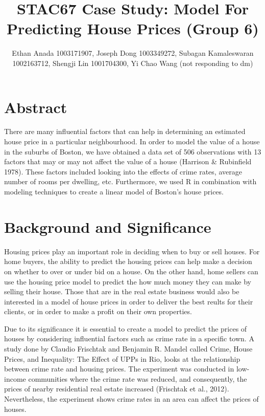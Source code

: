 \documentclass[]{article}
\title{STAC67 Case Study: Model For Predicting House Prices (Group 6)}
\author{Ethan Anada 1003171907, Joseph Dong 1003349272, Subagan Kamaleswaran
1002163712, Shengji Lin 1001704300, Yi Chao Wang (not responding to dm)}
\date{}
\begin{document}
\maketitle

\section{Abstract}\label{abstract}

There are many influential factors that can help in determining an
estimated house price in a particular neighbourhood. In order to model
the value of a house in the suburbs of Boston, we have obtained a data
set of 506 observations with 13 factors that may or may not affect the
value of a house (Harrison \& Rubinfield 1978). These factors included
looking into the effects of crime rates, average number of rooms per
dwelling, etc. Furthermore, we used R in combination with modeling
techniques to create a linear model of Boston's house prices.

\pagebreak

\section{Background and Significance}\label{background-and-significance}

Housing prices play an important role in deciding when to buy or sell
houses. For home buyers, the ability to predict the housing prices can
help make a decision on whether to over or under bid on a house. On the
other hand, home sellers can use the housing price model to predict the
how much money they can make by selling their house. Those that are in
the real estate business would also be interested in a model of house
prices in order to deliver the best reults for their clients, or in
order to make a profit on their own properties.

Due to its significance it is essential to create a model to predict the
prices of houses by considering influential factors such as crime rate
in a specific town. A study done by Claudio Frischtak and Benjamin R.
Mandel called Crime, House Prices, and Inequality: The Effect of UPPs in
Rio, looks at the relationship between crime rate and housing prices.
The experiment was conducted in low-income communities where the crime
rate was reduced, and consequently, the prices of nearby residential
real estate increased (Frischtak et al., 2012). Nevertheless, the
experiment shows crime rates in an area can affect the prices of houses.
\end{document}
